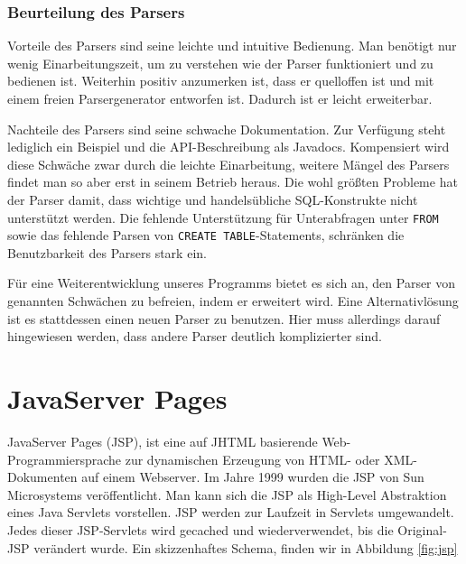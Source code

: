 \subsubsection*{Beurteilung des Parsers}

Vorteile des Parsers sind seine leichte und intuitive Bedienung. Man benötigt nur wenig Einarbeitungszeit, um zu verstehen wie der Parser funktioniert und zu bedienen ist. Weiterhin positiv anzumerken ist, dass er quelloffen ist und mit einem freien Parsergenerator \cite{javacc1} entworfen ist. Dadurch ist er leicht erweiterbar.

Nachteile des Parsers sind seine schwache Dokumentation. Zur Verfügung steht lediglich ein Beispiel und die API-Beschreibung als Javadocs. Kompensiert wird diese Schwäche zwar durch die leichte Einarbeitung, weitere Mängel des Parsers findet man so aber erst in seinem Betrieb heraus. Die wohl größten Probleme hat der Parser damit, dass wichtige und handelsübliche SQL-Konstrukte nicht unterstützt werden. Die fehlende Unterstützung für Unterabfragen unter \verb|FROM| sowie das fehlende Parsen von \verb|CREATE TABLE|-Statements, schränken die Benutzbarkeit des Parsers stark ein. 

Für eine Weiterentwicklung unseres Programms bietet es sich an, den Parser von genannten Schwächen zu befreien, indem er erweitert wird. Eine Alternativlösung ist es stattdessen einen neuen Parser zu benutzen. Hier muss allerdings darauf hingewiesen werden, dass andere Parser deutlich komplizierter sind.


\section{JavaServer Pages}

JavaServer Pages (JSP), ist eine auf JHTML basierende Web-Programmiersprache zur dynamischen Erzeugung von HTML- oder XML-Dokumenten auf einem Webserver. Im Jahre 1999 wurden die JSP von Sun Microsystems veröffentlicht. Man kann sich die JSP als High-Level Abstraktion eines Java Servlets vorstellen. JSP werden zur Laufzeit in Servlets umgewandelt. Jedes dieser JSP-Servlets wird gecached und wiederverwendet, bis die Original-JSP verändert wurde. Ein skizzenhaftes Schema, finden wir in Abbildung \ref{fig:jsp}


